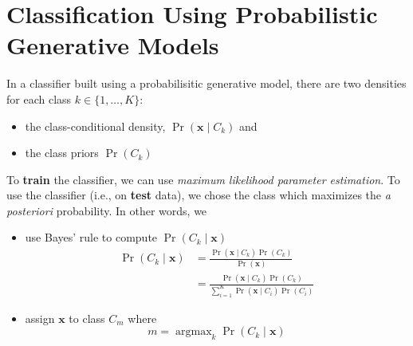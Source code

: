 \documentclass[11pt]{article}
\DeclareMathOperator*{\argmax}{argmax}
\newcommand{\xb}{\mathbf{x}}
\begin{document}
\section{Classification Using Probabilistic Generative Models}
In a classifier built using a probabilisitic generative model, there are two densities for each class $k \in \lbrace 1, \ldots, K\rbrace$:
\begin{itemize}
\item the class-conditional density, $\Pr \left(\xb \mid C_k\right)$ and
\item the class priors $\Pr \left(C_k\right)$
\end{itemize}

To \textbf{train} the classifier, we can use \textit{maximum likelihood parameter estimation}. To use the classifier (i.e., on \textbf{test} data), we chose the class which maximizes the \textit{a posteriori} probability. In other words, we
\begin{itemize}
\item use Bayes' rule to compute $\Pr \left(C_k \mid \xb\right)$
\begin{equation*}
    \begin{split}
        \Pr \left(C_k \mid \xb\right) &= \frac{\Pr\left(\xb \mid C_k\right) \Pr\left(C_k\right)}{\Pr\left(\xb\right)} \\
                    &= \frac{\Pr\left(\xb \mid C_k\right) \Pr\left(C_k\right)}{\sum_{i=1}^{K} \Pr\left(\xb \mid C_i\right) \Pr\left(C_i\right)} 
    \end{split}
\end{equation*}

\item assign $\xb$ to class $C_m$ where
\begin{equation*}
	m = \argmax_k \Pr \left(C_k \mid \xb\right)
 \end{equation*}
\end{itemize}
\end{document}

